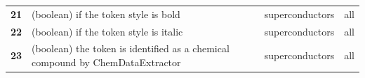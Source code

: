 \documentclass[]{interact}
\theoremstyle{plain}%
\theoremstyle{definition}
\theoremstyle{remark}
\begin{document}
\begin{table}[ht]
{\begin{tabular}{l m{30em} c c}
            \textbf{21}   & (boolean) if the token style is bold                                                                                                                                                                                                                     & superconductors & all                   \\
            \textbf{22}   & (boolean) if the token style is italic                                                                                                                                                                                                                   & superconductors & all                   \\
            \textbf{23}   & (boolean) the token is identified as a chemical compound by ChemDataExtractor\cite{chemdataextractor}                                                                                                                                                    & superconductors & all                   \\
            \bottomrule
        \end{tabular}
    }
    \label{tab:ML-model-features}
\end{table}

\end{document}
